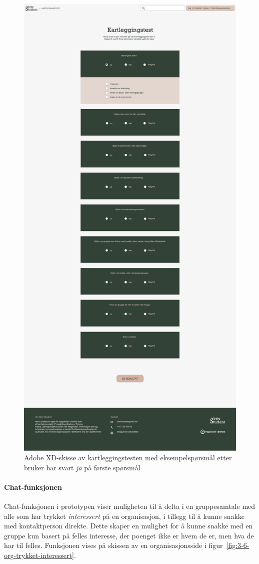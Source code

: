 \begin{figure}[H]
\centering
\includegraphics[width=.6\textwidth]{Illustrasjoner/Skisser-pdf/3.0/3-13-kartleggingstest-ved-svart-ja.pdf}
\caption{Adobe XD-skisse av kartleggingstesten med eksempelspørsmål etter bruker har svart {\em ja} på første spørsmål}
\label{fig:3-13-kartlegging-svart-ja}
\end{figure}

\paragraph{Chat-funksjonen}
Chat-funksjonen i prototypen viser muligheten til å delta i en gruppesamtale med alle som har trykket {\em interessert} på en organisasjon, i tillegg til å kunne snakke med kontaktperson direkte. Dette skaper en mulighet for å kunne snakke med en gruppe kun basert på felles interesse, der poenget ikke er hvem de er, men hva de har til felles. Funksjonen vises på skissen av en organisasjonsside i figur~\ref{fig:3-6-org-trykket-interessert}.

